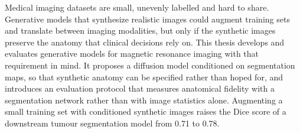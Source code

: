 Medical imaging datasets are small, unevenly labelled and hard to share. Generative models
that synthesize realistic images could augment training sets and translate between imaging
modalities, but only if the synthetic images preserve the anatomy that clinical decisions rely
on. This thesis develops and evaluates generative models for magnetic resonance imaging with
that requirement in mind. It proposes a diffusion model conditioned on segmentation maps, so
that synthetic anatomy can be specified rather than hoped for, and introduces an evaluation
protocol that measures anatomical fidelity with a segmentation network rather than with image
statistics alone. Augmenting a small training set with conditioned synthetic images raises the
Dice score of a downstream tumour segmentation model from 0.71 to 0.78.
